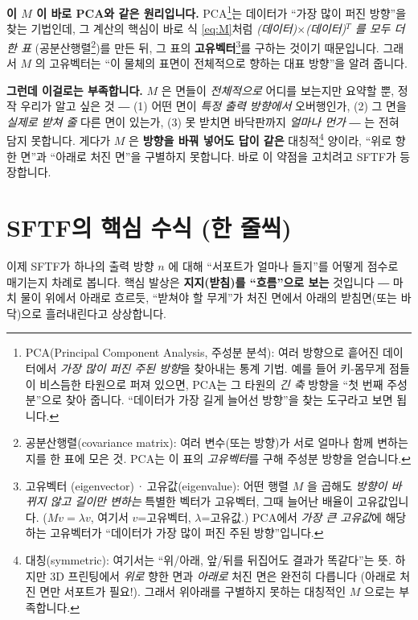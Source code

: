 \documentclass[11pt,a4paper]{article}
\begin{document}
\begin{notebox}
\textbf{이 $M$ 이 바로 PCA와 같은 원리입니다.}
PCA\footnote{PCA(Principal Component Analysis, 주성분 분석): 여러 방향으로 흩어진
데이터에서 \emph{가장 많이 퍼진 주된 방향}을 찾아내는 통계 기법. 예를 들어 키-몸무게
점들이 비스듬한 타원으로 퍼져 있으면, PCA는 그 타원의 \emph{긴 축} 방향을 ``첫 번째
주성분''으로 찾아 줍니다. ``데이터가 가장 길게 늘어선 방향''을 찾는 도구라고 보면
됩니다.}는 데이터가 ``가장 많이 퍼진 방향''을 찾는 기법인데, 그 계산의 핵심이 바로
식 \eqref{eq:M}처럼 \emph{(데이터)$\times$(데이터)$^{T}$ 를 모두 더한 표}
(공분산행렬\footnote{공분산행렬(covariance matrix): 여러 변수(또는 방향)가 서로
얼마나 함께 변하는지를 한 표에 모은 것. PCA는 이 표의 \emph{고유벡터}를 구해 주성분
방향을 얻습니다.})를 만든 뒤, 그 표의 \textbf{고유벡터}\footnote{고유벡터
(eigenvector)\,·\,고유값(eigenvalue): 어떤 행렬 $M$ 을 곱해도 \emph{방향이 바뀌지
않고 길이만 변하는} 특별한 벡터가 고유벡터, 그때 늘어난 배율이 고유값입니다.
($M v = \lambda v$, 여기서 $v$=고유벡터, $\lambda$=고유값.) PCA에서 \emph{가장 큰
고유값}에 해당하는 고유벡터가 ``데이터가 가장 많이 퍼진 주된 방향''입니다.}를 구하는
것이기 때문입니다. 그래서 $M$ 의 고유벡터는 ``이 물체의 표면이 전체적으로 향하는
대표 방향''을 알려 줍니다.
\end{notebox}

\textbf{그런데 이걸로는 부족합니다.} $M$ 은 면들이 \emph{전체적으로} 어디를 보는지만
요약할 뿐, 정작 우리가 알고 싶은 것 ―
(1) 어떤 면이 \emph{특정 출력 방향에서} 오버행인가,
(2) 그 면을 \emph{실제로 받쳐 줄} 다른 면이 있는가,
(3) 못 받치면 바닥판까지 \emph{얼마나 먼가} ―
는 전혀 담지 못합니다. 게다가 $M$ 은 \textbf{방향을 바꿔 넣어도 답이 같은}
대칭적\footnote{대칭(symmetric): 여기서는 ``위/아래, 앞/뒤를 뒤집어도 결과가 똑같다''는
뜻. 하지만 3D 프린팅에서 \emph{위로} 향한 면과 \emph{아래로} 처진 면은 완전히 다릅니다
(아래로 처진 면만 서포트가 필요!). 그래서 위아래를 구별하지 못하는 대칭적인 $M$ 으로는
부족합니다.} 양이라, ``위로 향한 면''과 ``아래로 처진 면''을 구별하지 못합니다.
바로 이 약점을 고치려고 SFTF가 등장합니다.

\section{SFTF의 핵심 수식 (한 줄씩)}

이제 SFTF가 하나의 출력 방향 $n$ 에 대해 ``서포트가 얼마나 들지''를 어떻게
점수로 매기는지 차례로 봅니다. 핵심 발상은 \textbf{지지(받침)를 ``흐름''으로 보는}
것입니다 ― 마치 물이 위에서 아래로 흐르듯, ``받쳐야 할 무게''가 처진 면에서
아래의 받침면(또는 바닥)으로 흘러내린다고 상상합니다.
\end{document}
